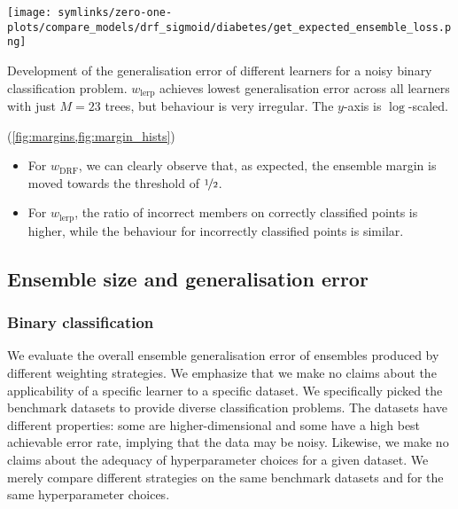 \documentclass[../main.tex]{subfiles}
\begin{document}
\begin{marginfigure}
    \texttt{[image: symlinks/zero-one-plots/compare\_models/drf\_sigmoid/diabetes/get\_expected\_ensemble\_loss.png]}
    \caption{
     Development of the generalisation error of different learners for a noisy binary classification problem.  $w_\text{lerp}$ achieves lowest generalisation error across all learners with just $M=23$ trees, but behaviour is very irregular.
    The $y$-axis is $\log$-scaled.
     }
    \label{fig:ensemble-loss-diabetes}
\end{marginfigure}

\begin{observation}  (\cf \cref{fig:margins,fig:margin_hists})
    \begin{itemize}
        \item For $w_\text{DRF}$, we can clearly observe that, as expected, the ensemble margin is moved towards the threshold of $\nicefrac{1}{2}$. 
        \item For $w_\text{lerp}$, the ratio of incorrect members on correctly classified points is higher, while the behaviour for incorrectly classified points is similar.
    \end{itemize}
\end{observation}

\subsection{Ensemble size and generalisation error}
\label{sec:gen-error}

\subsubsection{Binary classification}

We evaluate the overall ensemble generalisation error of ensembles produced by different weighting strategies. We emphasize that we make no claims about the applicability of a specific learner to a specific dataset. We specifically picked the benchmark datasets to provide diverse classification problems. The datasets have different properties: some are higher-dimensional and some have a high best achievable error rate, implying that the data may be noisy. Likewise, we make no claims about the adequacy of hyperparameter choices for a given dataset. 
We merely compare different strategies on the same benchmark datasets and for the same hyperparameter choices.
\end{document}
